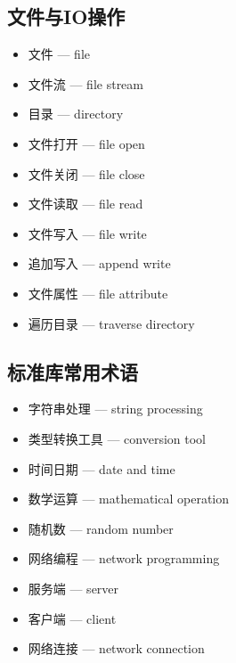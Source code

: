 \subsection{文件与IO操作}
\begin{itemize}
\item 文件 — file
\item 文件流 — file stream
\item 目录 — directory
\item 文件打开 — file open
\item 文件关闭 — file close
\item 文件读取 — file read
\item 文件写入 — file write
\item 追加写入 — append write
\item 文件属性 — file attribute
\item 遍历目录 — traverse directory
\end{itemize}

\subsection{标准库常用术语}
\begin{itemize}
\item 字符串处理 — string processing
\item 类型转换工具 — conversion tool
\item 时间日期 — date and time
\item 数学运算 — mathematical operation
\item 随机数 — random number
\item 网络编程 — network programming
\item 服务端 — server
\item 客户端 — client
\item 网络连接 — network connection
\end{itemize}
